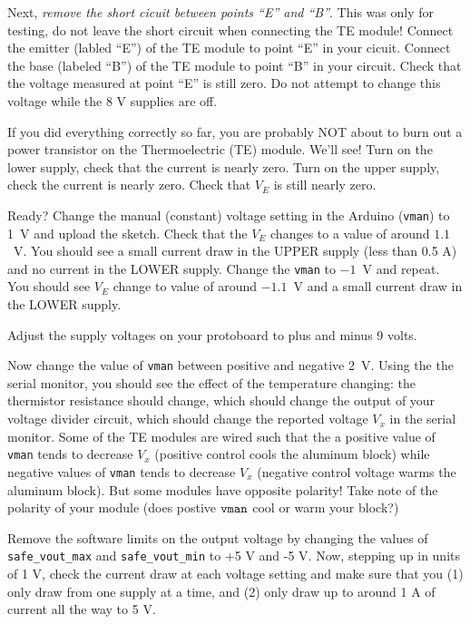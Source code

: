 \documentclass[12pt]{article}
\begin{document}
Next, {\em remove the short cicuit between points ``E'' and ``B''}.  This was
only for testing, do not leave the short circuit when connecting the TE module!
Connect the emitter (labled ``E'') of the TE module to point ``E'' in your
cicuit.  Connect the base (labeled ``B'') of the TE module to point ``B'' in
your circuit.  Check that the voltage measured at point ``E'' is still zero.  Do
not attempt to change this voltage while the 8 V supplies are off.

If you did everything correctly so far, you are probably NOT about to burn out a
power transistor on the Thermoelectric (TE) module.  We'll see!  Turn on the
lower supply, check that the current is nearly zero.  Turn on the upper supply,
check the current is nearly zero.  Check that $V_E$ is still nearly zero.

Ready?  Change the manual (constant) voltage setting in the Arduino ({\tt vman})
to 1~V and upload the sketch.  Check that the $V_E$ changes to a value of around
$1.1$~V.  You should see a small current draw in the UPPER supply (less than 0.5
A) and no current in the LOWER supply.  Change the {\tt vman} to $-1$~V and
repeat.  You should see $V_E$ change to value of around $-1.1$~V and a small
current draw in the LOWER supply.

Adjust the supply voltages on your protoboard to plus and minus 9 volts. 

Now change the value of {\tt vman} between positive and negative 2~V.  Using the
the serial monitor, you should see the effect of the temperature changing: the
thermistor resistance should change, which should change the output of your
voltage divider circuit, which should change the reported voltage $V_x$ in the
serial monitor.  Some of the TE modules are wired such that the a positive value
of {\tt vman} tends to decrease $V_x$ (positive control cools the aluminum
block) while negative values of {\tt vman} tends to decrease $V_x$ (negative
control voltage warms the aluminum block).  But some modules have opposite
polarity!  Take note of the polarity of your module (does postive $\tt vman$
cool or warm your block?)

Remove the software limits on the output voltage by changing the values of {\tt
  safe\_vout\_max} and {\tt safe\_vout\_min} to +5 V and -5 V.  Now, stepping up
in units of 1 V, check the current draw at each voltage setting and make sure
that you (1) only draw from one supply at a time, and (2) only draw up to around
1 A of current all the way to 5 V.
\end{document}
